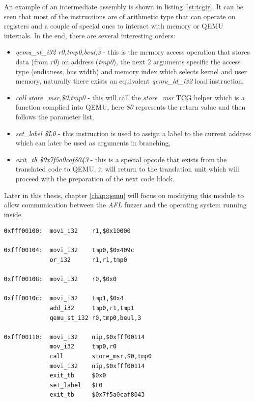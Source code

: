 An example of an intermediate assembly is shown in listing \ref{lst:tcgir}. It can be seen that most of the instructions are of arithmetic type that can operate on registers and a couple of special ones to interact with memory or QEMU internals. In the end, there are several interesting orders:
\begin{itemize}
    \item \textit{qemu\_st\_i32 r0,tmp0,beul,3} - this is the memory access operation that stores data (from \textit{r0}) on address (\textit{tmp0}), the next 2 arguments specific the access type (endianess, bus width) and memory index which selects kernel and user memory, naturally there exists an equivalent \textit{qemu\_ld\_i32} load instruction,
    \item \textit{call        store\_msr,\$0,tmp0} - this will call the \textit{store\_msr} TCG helper which is a function complied into QEMU, here \textit{\$0} represents the return value and then follows the parameter list,
    \item \textit{set\_label   \$L0} - this instruction is used to assign a label to the current address which can later be used as arguments in branching,
    \item \textit{exit\_tb     \$0x7f5a0caf8043} - this is a special opcode that exists from the translated code to QEMU, it will return to the translation unit which will proceed with the preparation of the next code block.
\end{itemize}
Later in this thesis, chapter \ref{chap:qemu} will focus on modifying this module to allow communication between the \textit{AFL} fuzzer and the operating system running inside.

\begin{minipage}{\linewidth}
\begin{lstlisting}[caption={QEMU TCG intermediate assembly code from \cite{qemutcgir}.},label={lst:tcgir}]
0xfff00100:  movi_i32    r1,$0x10000

0xfff00104:  movi_i32    tmp0,$0x409c
             or_i32      r1,r1,tmp0

0xfff00108:  movi_i32    r0,$0x0

0xfff0010c:  movi_i32    tmp1,$0x4
             add_i32     tmp0,r1,tmp1
             qemu_st_i32 r0,tmp0,beul,3

0xfff00110:  movi_i32    nip,$0xfff00114
             mov_i32     tmp0,r0
             call        store_msr,$0,tmp0
             movi_i32    nip,$0xfff00114
             exit_tb     $0x0
             set_label   $L0
             exit_tb     $0x7f5a0caf8043
\end{lstlisting}
\end{minipage}


